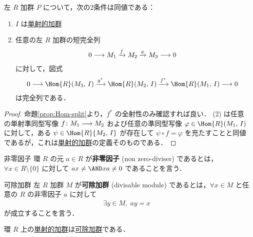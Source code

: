 \documentclass[algtopo_main]{subfiles}
\begin{document}
\begin{myprop}[label=prop:inj-mod-basic]{}
    左 $R$ 加群 $P$ について，次の2条件は同値である：
    \begin{enumerate}
        \item $I$ は\hyperref[def:inj-mod]{単射的加群}
        \item 任意の左 $R$ 加群の短完全列
        \begin{align}
            0 \longrightarrow M_1 \xrightarrow{f} M_2 \xrightarrow{g} M_3 \longrightarrow 0
        \end{align}
        に対して，図式
        \begin{align}
            \label{eq:prop-proj-hom}
            0 \lto \Hom{R} (M_3,\, I) \xrightarrow{g^*} \Hom{R}(M_2,\, I) \xrightarrow{f^*} \Hom{R}(M_1,\, I) \lto 0
        \end{align}
        は完全列である．
    \end{enumerate}
\end{myprop}

\begin{proof}
    命題\ref{prop:Hom-split}より，$f^*$ の全射性のみ確認すれば良い．
    (2) は任意の単射準同型写像 $f \colon M_1 \longrightarrow M_2$ および任意の準同型写像 $\varphi \in \Hom{R}(M_1,\, I)$ に対して，ある $\psi \in \Hom{R}{M_2,\, I}$ が存在して $\psi \circ f = \varphi$ を充たすことと同値であるが，これは\hyperref[def:inj-mod]{単射的加群}の定義そのものである．
\end{proof}

\begin{mydef}[label=def:non-zero-diviser]{非零因子}
    環 $R$ の元 $a \in R$ が\textbf{非零因子} (non zero-diviser) であるとは，$\forall x \in R \setminus \{0\}$ に対して $ax \neq \AND xa \neq 0$ であることを言う．
\end{mydef}


\begin{mydef}[label=def:divisable-mod]{可除加群}
    左 $R$ 加群 $M$ が\textbf{可除加群} (divisable module) であるとは，$\forall x \in M$ と任意の $R$ の非零因子 $a$ に対して
    \begin{align}
        \exists y \in M,\; ay = x
    \end{align}
    が成立することを言う．
\end{mydef}

\begin{myprop}[label=prop:inj-mod-divisable]{}
    環 $R$ 上の\hyperref[def:inj-mod]{単射的加群}は\hyperref[def:divisable-mod]{可除加群}である．
\end{myprop}
\end{document}
